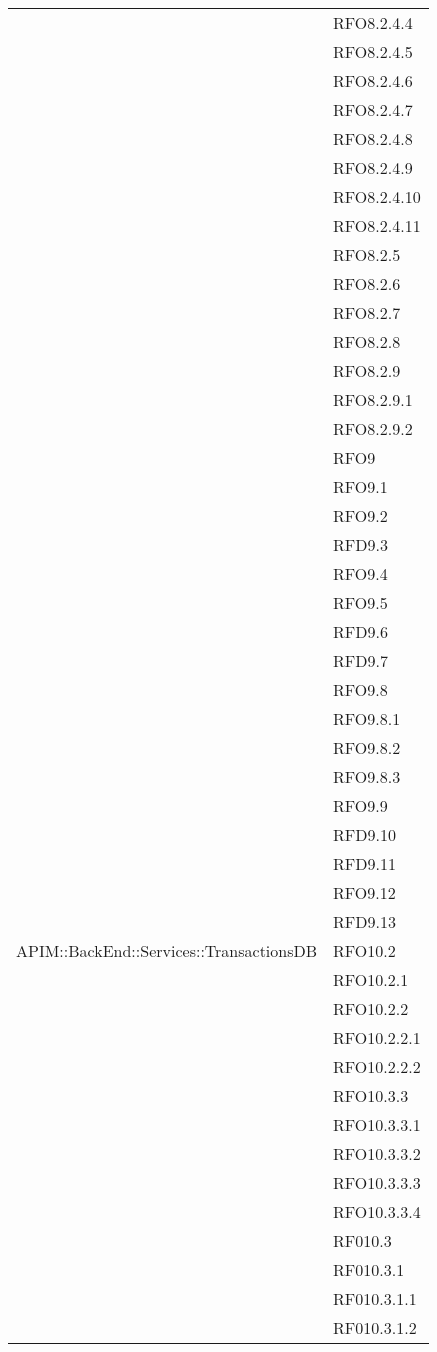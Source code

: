 \begin{longtable}{ p{12cm} | p{4cm} }
	& RFO8.2.4.4 \\
	& RFO8.2.4.5 \\
	& RFO8.2.4.6 \\
	& RFO8.2.4.7 \\
	& RFO8.2.4.8 \\
	& RFO8.2.4.9 \\
	& RFO8.2.4.10 \\
	& RFO8.2.4.11 \\
	& RFO8.2.5 \\
	& RFO8.2.6 \\
	& RFO8.2.7 \\
	& RFO8.2.8 \\
	& RFO8.2.9 \\
	& RFO8.2.9.1 \\
	& RFO8.2.9.2 \\
	& RFO9 \\
	& RFO9.1 \\
	& RFO9.2 \\
	& RFD9.3 \\
	& RFO9.4 \\
	& RFO9.5 \\
	& RFD9.6 \\
	& RFD9.7 \\
	& RFO9.8 \\
	& RFO9.8.1 \\
	& RFO9.8.2 \\
	& RFO9.8.3 \\
	& RFO9.9 \\
	& RFD9.10 \\
	& RFD9.11 \\
	& RFO9.12 \\
	& RFD9.13 \\
	\hline
	APIM::BackEnd::Services::TransactionsDB
	& RFO10.2 \\
	& RFO10.2.1 \\
	& RFO10.2.2 \\
	& RFO10.2.2.1 \\
	& RFO10.2.2.2 \\
	& RFO10.3.3 \\
	& RFO10.3.3.1 \\
	& RFO10.3.3.2 \\
	& RFO10.3.3.3 \\
	& RFO10.3.3.4 \\
	& RF010.3 \\
	& RF010.3.1 \\
	& RF010.3.1.1 \\
	& RF010.3.1.2 \\

\end{longtable}
